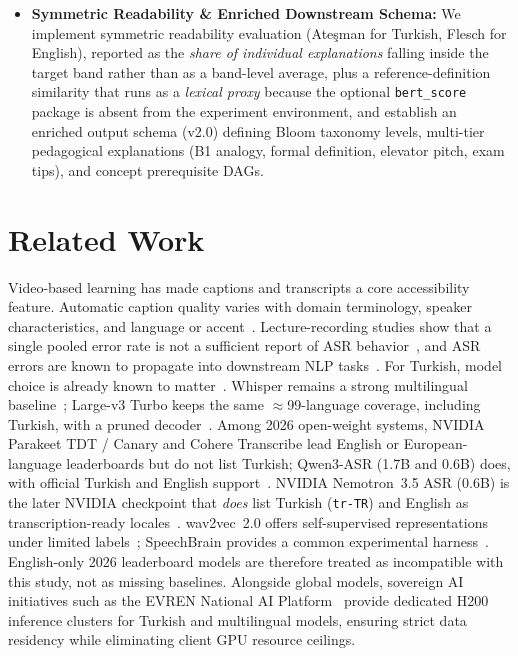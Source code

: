 \documentclass[conference]{IEEEtran}
\begin{document}
\begin{itemize}
\item \textbf{Symmetric Readability \& Enriched Downstream Schema:} We implement symmetric readability evaluation (Ate\c{s}man for Turkish, Flesch for English), reported as the \emph{share of individual explanations} falling inside the target band rather than as a band-level average, plus a reference-definition similarity that runs as a \emph{lexical proxy} because the optional \texttt{bert\_score} package is absent from the experiment environment, and establish an enriched output schema (v2.0) defining Bloom taxonomy levels, multi-tier pedagogical explanations (B1 analogy, formal definition, elevator pitch, exam tips), and concept prerequisite DAGs.
\end{itemize}

\section{Related Work}

Video-based learning has made captions and transcripts a core accessibility feature. Automatic caption quality varies with domain terminology, speaker characteristics, and language or accent~\cite{kuhn2024}. Lecture-recording studies show that a single pooled error rate is not a sufficient report of ASR behavior~\cite{kuhn2024}, and ASR errors are known to propagate into downstream NLP tasks~\cite{southwell2022}. For Turkish, model choice is already known to matter~\cite{mercan2023}. Whisper remains a strong multilingual baseline~\cite{radford2023}; Large-v3 Turbo keeps the same $\approx$99-language coverage, including Turkish, with a pruned decoder~\cite{whisper-turbo}. Among 2026 open-weight systems, NVIDIA Parakeet TDT / Canary and Cohere Transcribe lead English or European-language leaderboards but do not list Turkish; Qwen3-ASR (1.7B and 0.6B) does, with official Turkish and English support~\cite{qwen3asr2026}. NVIDIA Nemotron~3.5 ASR (0.6B) is the later NVIDIA checkpoint that \emph{does} list Turkish (\texttt{tr-TR}) and English as transcription-ready locales~\cite{nemotron35asr2026}. wav2vec~2.0 offers self-supervised representations under limited labels~\cite{baevski2020}; SpeechBrain provides a common experimental harness~\cite{ravanelli2021}. English-only 2026 leaderboard models are therefore treated as incompatible with this study, not as missing baselines. Alongside global models, sovereign AI initiatives such as the EVREN National AI Platform~\cite{evren2026} provide dedicated H200 inference clusters for Turkish and multilingual models, ensuring strict data residency while eliminating client GPU resource ceilings.
\end{document}
